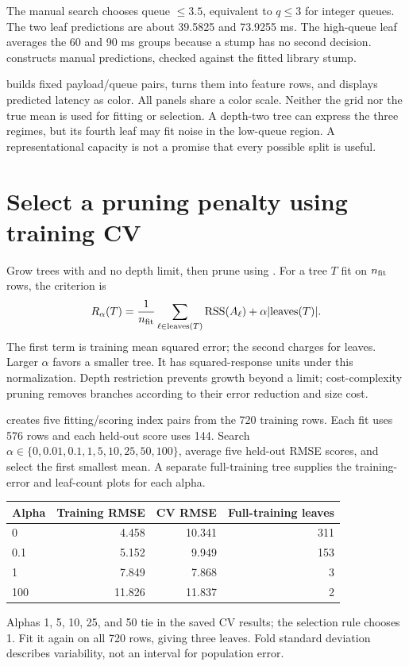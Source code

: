 The manual search chooses queue $\le3.5$, equivalent to $q\le3$ for integer queues. The two leaf predictions are about 39.5825 and 73.9255 ms. The high-queue leaf averages the 60 and 90 ms groups because a stump has no second decision.  constructs manual predictions, checked against the fitted library stump.

 builds fixed payload/queue pairs,  turns them into feature rows, and  displays predicted latency as color. All panels share a color scale. Neither the grid nor the true mean is used for fitting or selection.
A depth-two tree can express the three regimes, but its fourth leaf may fit noise in the low-queue region. A representational capacity is not a promise that every possible split is useful.

\section{Select a pruning penalty using training CV}
Grow trees with  and no depth limit, then prune using . For a tree $T$ fit on $n_{\rm fit}$ rows, the criterion is
\[R_\alpha(T)=\frac1{n_{\rm fit}}\sum_{\ell\in\mathrm{leaves}(T)}\operatorname{RSS}(A_\ell)+\alpha|\mathrm{leaves}(T)|.\]
The first term is training mean squared error; the second charges for leaves. Larger $\alpha$ favors a smaller tree. It has squared-response units under this normalization. Depth restriction prevents growth beyond a limit; cost-complexity pruning removes branches according to their error reduction and size cost.

 creates five fitting/scoring index pairs from the 720 training rows. Each fit uses 576 rows and each held-out score uses 144. Search $\alpha\in\{0,0.01,0.1,1,5,10,25,50,100\}$, average five held-out RMSE scores, and select the first smallest mean. A separate full-training tree supplies the training-error and leaf-count plots for each alpha.
\begin{center}
\begin{tabular}{lrrr}\toprule
Alpha&Training RMSE&CV RMSE&Full-training leaves\\\midrule
0&4.458&10.341&311\\
0.1&5.152&9.949&153\\
1&7.849&7.868&3\\
100&11.826&11.837&2\\\bottomrule
\end{tabular}
\end{center}
Alphas 1, 5, 10, 25, and 50 tie in the saved CV results; the selection rule chooses 1. Fit it again on all 720 rows, giving three leaves. Fold standard deviation describes variability, not an interval for population error.

